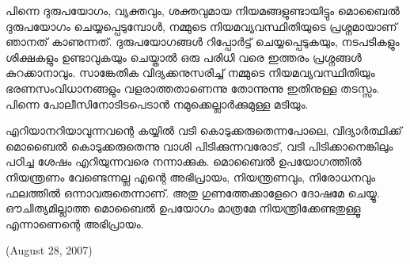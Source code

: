 പിന്നെ ദുരുപയോഗം, വ്യക്തവും, ശക്തവുമായ നിയമങ്ങളുണ്ടായിട്ടും മൊബൈല്‍ ദുരുപയോഗം ചെയ്യപ്പെടുമ്പോള്‍,
 നമ്മുടെ നിയമവ്യവസ്ഥിതിയുടെ പ്രശ്നമായാണ് ഞാനത് കാണുന്നത്. ദുരുപയോഗങ്ങള്‍ റിപ്പോര്‍ട്ട് ചെയ്യപ്പെടുകയും,
 നടപടികളും ശിക്ഷകളും ഉണ്ടാവുകയും ചെയ്താല്‍ ഒരു പരിധി വരെ ഇത്തരം പ്രശ്നങ്ങള്‍ കുറക്കാനാവും. 
സാങ്കേതിക വിദ്യക്കനുസരിച്ച് നമ്മുടെ നിയമവ്യവസ്ഥിതിയും ഭരണസംവിധാനങ്ങളും വളരാത്തതാണെന്നു തോന്നുന്നു
 ഇതിനുള്ള തടസ്സം. പിന്നെ പോലീസിനോടിടപെടാന്‍ നമുക്കെല്ലാര്‍ക്കുമുള്ള മടിയും.

എറിയാനറിയാവുന്നവന്റെ കയ്യില്‍ വടി കൊടുക്കരുതെന്നപോലെ, വിദ്യാര്‍ത്ഥിക്ക് മൊബൈല്‍ കൊടുക്കരുതെന്നു വാശി 
പിടിക്കുന്നവരോട്, വടി പിടിക്കാനെങ്കിലും പഠിച്ച ശേഷം എറിയുന്നവരെ നന്നാക്കുക. മൊബൈല്‍ ഉപയോഗത്തില്‍ നിയന്ത്രണം 
വേണ്ടെന്നല്ല എന്റെ അഭിപ്രായം, നിയന്ത്രണവും, നിരോധനവും ഫലത്തില്‍ ഒന്നാവരുതെന്നാണ്. അതു ഗുണത്തേക്കാളേറെ 
ദോഷമേ ചെയ്യൂ. ഔചിത്യമില്ലാത്ത മൊബൈല്‍ ഉപയോഗം മാത്രമേ നിയന്ത്രിക്കേണ്ടതുള്ളൂ എന്നാണെന്റെ അഭിപ്രായം.

(August 28, 2007)
\newpage
